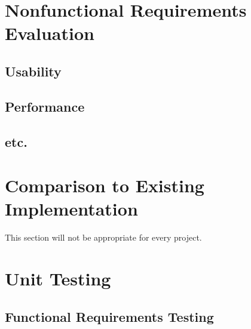 \documentclass[12pt, titlepage]{article}
\begin{document}
\newpage

\section{Nonfunctional Requirements Evaluation}

\subsection{Usability}
		
\subsection{Performance}

\subsection{etc.}
	
\section{Comparison to Existing Implementation}	

This section will not be appropriate for every project.

\section{Unit Testing}

\subsection{Functional Requirements Testing}
\end{document}
